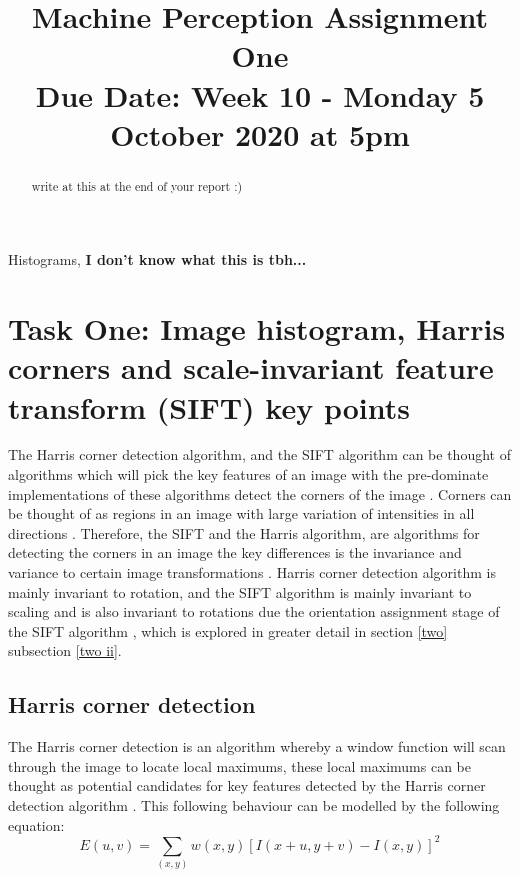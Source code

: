 \documentclass[conference]{IEEEtran}
\begin{document}
\lstset{
  columns=fullflexible,
  basicstyle=\ttfamily,
}

\title{Machine Perception Assignment One\\
{\footnotesize \textbf{Due Date:} Week 10 - Monday 5 October 2020 at 5pm}
}

\author{
}

\maketitle

\begin{abstract}
write at this at the end of your report :)
\end{abstract}

\begin{IEEEkeywords}
Histograms, \textbf{I don't know what this is tbh...}
\end{IEEEkeywords}

\section{Task One: Image histogram, Harris corners and scale-invariant feature transform (SIFT) key points}\label{one}
The Harris corner detection algorithm, and the SIFT algorithm can be thought of algorithms which will pick the key features of an image with the pre-dominate implementations of these algorithms detect the corners of the image \cite{b2} \cite{b3}. Corners can be thought of as regions in an image with large variation of intensities in all directions \cite{b2}. Therefore, the SIFT and the Harris algorithm, are algorithms for detecting the corners in an image the key differences is the invariance and variance to certain image transformations \cite{b3}. Harris corner detection algorithm is mainly invariant to rotation, and the SIFT algorithm is mainly invariant to scaling and is also invariant to rotations due the orientation assignment stage of the SIFT algorithm \cite{b3}, which is explored in greater detail in section \ref{two} subsection \ref{two ii}.

\subsection{Harris corner detection} \label{one-theory}
The Harris corner detection is an algorithm whereby a window function will scan through the image to locate local maximums, these local maximums can be thought as potential candidates for key features detected by the Harris corner detection algorithm \cite{b4} \cite{b2}. This following behaviour can be modelled by the following equation:
\begin{equation}
	E(u,v) = \sum\limits_{(x,y)} w(x,y) [I(x + u, y+v) - I(x,y)]^2
\end{equation}
\end{document}
